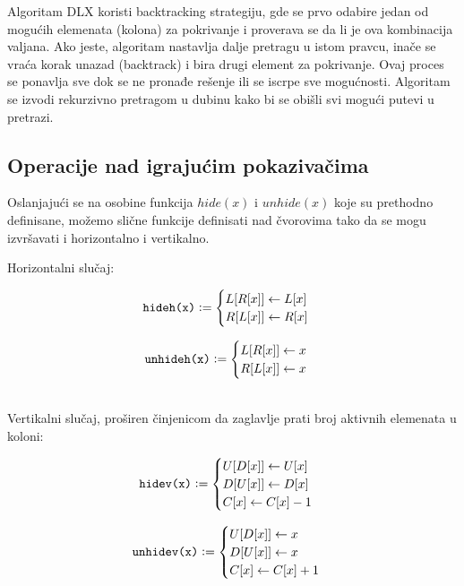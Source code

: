 \documentclass[a4paper]{article}
\begin{document}
{Algoritam DLX koristi backtracking strategiju, gde se prvo odabire jedan od mogućih elemenata (kolona) za
pokrivanje i proverava se da li je ova kombinacija valjana. Ako jeste, algoritam nastavlja dalje pretragu
u istom pravcu, inače se vraća korak unazad (backtrack) i bira drugi element za pokrivanje. Ovaj proces se
ponavlja sve dok se ne pronađe rešenje ili se iscrpe sve mogućnosti. Algoritam se izvodi rekurzivno
pretragom u dubinu kako bi se obišli svi mogući putevi u pretrazi.

\subsection{Operacije nad igrajućim pokazivačima}

Oslanjajući se na osobine funkcija  \( hide(x) \) i \( unhide(x) \) koje su prethodno definisane,
možemo slične funkcije definisati nad čvorovima tako da se mogu izvršavati i horizontalno i vertikalno.

Horizontalni slučaj:\\
\begin{minipage}{0.45\textwidth}
  \[
  \texttt{hideh(x)} \vcentcolon =
  \begin{cases}
    L[R[x]] \gets L[x] \\
    R[L[x]] \gets R[x]
  \end{cases}
  \]
\end{minipage}
\begin{minipage}{0.45\textwidth}
  \[
  \texttt{unhideh(x)} \vcentcolon =
  \begin{cases}
    L[R[x]] \gets x \\
    R[L[x]] \gets x
  \end{cases}
  \]
\end{minipage}\\

Vertikalni slučaj, proširen činjenicom da zaglavlje prati broj aktivnih elemenata u koloni:\\
  \begin{minipage}{0.45\textwidth}
  \[
  \texttt{hidev(x)} \vcentcolon =
  \begin{cases}
    U[D[x]] \gets U[x] \\
    D[U[x]] \gets D[x] \\
    C[x] \gets C[x] - 1
  \end{cases}
  \]
\end{minipage}
\begin{minipage}{0.45\textwidth}
  \[
  \texttt{unhidev(x)} \vcentcolon =
  \begin{cases}
    U[D[x]] \gets x \\
    D[U[x]] \gets x \\
    C[x] \gets C[x] + 1
  \end{cases}
  \]
  \end{minipage}\\

}
\end{document}
